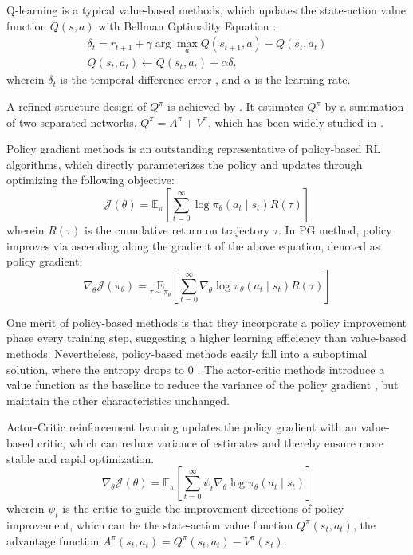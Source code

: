 Q-learning is a typical value-based methods, which updates the state-action value function $Q(s,a)$ with Bellman Optimality Equation \citep{qlearning}: 
\begin{equation*}
    \begin{array}{c}
    \delta_{t}=r_{t+1}+\gamma \arg \max _{a} Q\left(s_{t+1}, a\right)-Q\left(s_{t}, a_{t}\right) \\
    Q\left(s_{t}, a_{t}\right) \leftarrow Q\left(s_{t}, a_{t}\right)+\alpha \delta_{t}
    \end{array}
\end{equation*}
wherein $\delta_t$ is the temporal difference error \citep{TDerror}, and $\alpha$ is the learning rate.

A refined structure design of $Q^\pi$ is achieved by \citep{dueling_q}. It estimates $Q^\pi$ by a summation of two separated networks, $Q^\pi = A^\pi + V^\pi$, which has been widely studied in \citep{dueling_q,casa_bridge}.


Policy gradient \citep[PG]{williams1992simple} methods is an outstanding representative of policy-based RL algorithms, which directly parameterizes the policy and  updates through optimizing the following objective: 
\begin{equation*}
    \mathcal{J} (\theta)=\mathbb{E}_{\pi}\left[\sum_{t=0}^{\infty} \log \pi_{\theta}\left(a_{t} \mid s_{t}\right) R(\tau)\right]
\end{equation*}
wherein $R(\tau)$ is the cumulative return on trajectory $\tau$. In PG method, policy improves via ascending  along the gradient of the above equation, denoted as policy gradient:
\begin{equation*}
\nabla_{\theta} \mathcal{J} \left(\pi_{\theta}\right) =\underset{\tau \sim \pi_{\theta}}{\mathrm{E}}\left[\sum_{t=0}^{\infty} \nabla_{\theta} \log \pi_{\theta}\left(a_{t} \mid s_{t}\right) R(\tau)\right]
\end{equation*}

One merit of policy-based methods is that they incorporate a policy improvement phase every training step, suggesting a higher learning efficiency than value-based methods.
Nevertheless, policy-based methods easily fall into a suboptimal solution, where the entropy drops to $0$ \citep{sac}.
The actor-critic methods introduce a value function as the baseline to reduce the variance of the policy gradient \citep{a3c}, but maintain the other characteristics unchanged.

Actor-Critic \citep[AC]{sutton} reinforcement learning updates the policy gradient with an value-based critic, which can reduce variance of estimates and thereby ensure  more stable and rapid optimization.
\begin{equation*}
    \nabla_{\theta} \mathcal{J}(\theta)=\mathbb{E}_{\pi}\left[\sum_{t=0}^{\infty} \psi_{t} \nabla_{\theta} \log \pi_{\theta}\left(a_{t} \mid s_{t}\right)\right]
\end{equation*}
wherein $\psi_{t}$ is the critic to guide the improvement directions of policy improvement, which can be the state-action value function $Q^{\pi}\left(s_{t}, a_{t}\right)$, the advantage function $A^{\pi}\left(s_{t}, a_{t}\right)=Q^{\pi}\left(s_{t}, a_{t}\right)-V^{\pi}(s_t)$.

